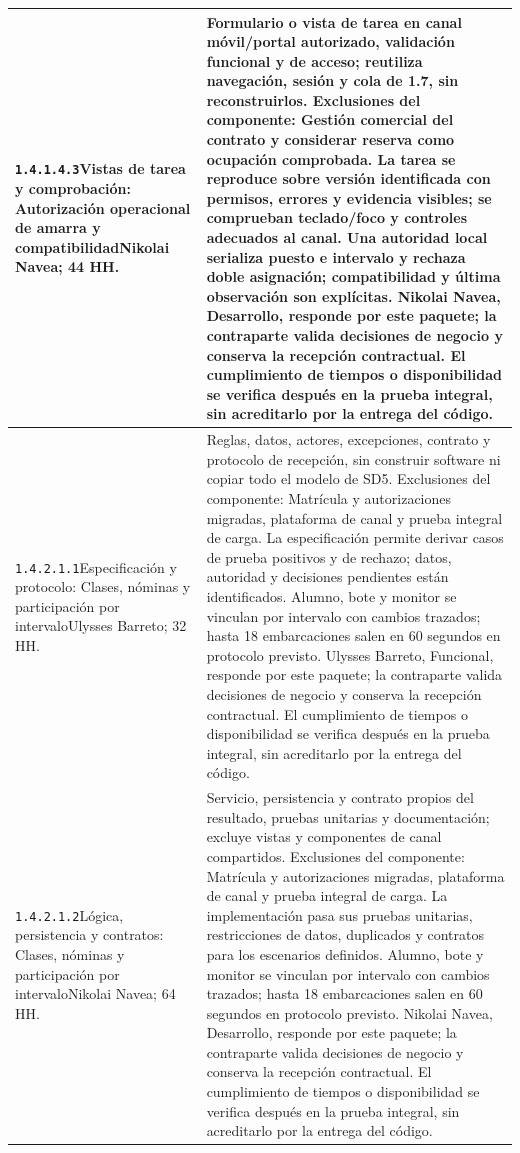 \begin{longtable}{L{52mm}L{91mm}}
\texttt{1.\allowbreak{}4.\allowbreak{}1.\allowbreak{}4.\allowbreak{}3}\newline Vistas de tarea y comprobación: Autorización operacional de amarra y compatibilidad\newline Nikolai Navea; 44 HH. & Formulario o vista de tarea en canal móvil/portal autorizado, validación funcional y de acceso; reutiliza navegación, sesión y cola de 1.7, sin reconstruirlos. Exclusiones del componente: Gestión comercial del contrato y considerar reserva como ocupación comprobada. La tarea se reproduce sobre versión identificada con permisos, errores y evidencia visibles; se comprueban teclado/foco y controles adecuados al canal. Una autoridad local serializa puesto e intervalo y rechaza doble asignación; compatibilidad y última observación son explícitas. Nikolai Navea, Desarrollo, responde por este paquete; la contraparte valida decisiones de negocio y conserva la recepción contractual. El cumplimiento de tiempos o disponibilidad se verifica después en la prueba integral, sin acreditarlo por la entrega del código.\\\hline
\texttt{1.\allowbreak{}4.\allowbreak{}2.\allowbreak{}1.\allowbreak{}1}\newline Especificación y protocolo: Clases, nóminas y participación por intervalo\newline Ulysses Barreto; 32 HH. & Reglas, datos, actores, excepciones, contrato y protocolo de recepción, sin construir software ni copiar todo el modelo de SD5. Exclusiones del componente: Matrícula y autorizaciones migradas, plataforma de canal y prueba integral de carga. La especificación permite derivar casos de prueba positivos y de rechazo; datos, autoridad y decisiones pendientes están identificados. Alumno, bote y monitor se vinculan por intervalo con cambios trazados; hasta 18 embarcaciones salen en 60 segundos en protocolo previsto. Ulysses Barreto, Funcional, responde por este paquete; la contraparte valida decisiones de negocio y conserva la recepción contractual. El cumplimiento de tiempos o disponibilidad se verifica después en la prueba integral, sin acreditarlo por la entrega del código.\\\hline
\texttt{1.\allowbreak{}4.\allowbreak{}2.\allowbreak{}1.\allowbreak{}2}\newline Lógica, persistencia y contratos: Clases, nóminas y participación por intervalo\newline Nikolai Navea; 64 HH. & Servicio, persistencia y contrato propios del resultado, pruebas unitarias y documentación; excluye vistas y componentes de canal compartidos. Exclusiones del componente: Matrícula y autorizaciones migradas, plataforma de canal y prueba integral de carga. La implementación pasa sus pruebas unitarias, restricciones de datos, duplicados y contratos para los escenarios definidos. Alumno, bote y monitor se vinculan por intervalo con cambios trazados; hasta 18 embarcaciones salen en 60 segundos en protocolo previsto. Nikolai Navea, Desarrollo, responde por este paquete; la contraparte valida decisiones de negocio y conserva la recepción contractual. El cumplimiento de tiempos o disponibilidad se verifica después en la prueba integral, sin acreditarlo por la entrega del código.\\\hline

\end{longtable}
